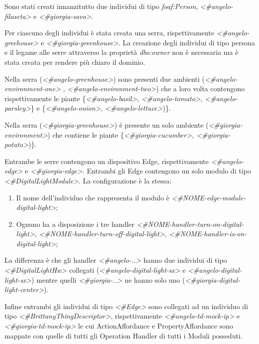 \noindent Sono stati creati innanzitutto due individui di tipo \textit{foaf:Person}, \textit{<\#angelo-filaseta>} e \textit{<\#giorgia-savo>}.\newline

\noindent Per ciascuno degli individui è stata creata una serra, rispettivamente \textit{<\#angelo-greehouse>} e \textit{<\#giorgia-greenhouse>}. La creazione degli individui di tipo persona e il legame alle serre attraverso la proprietà \textit{dbo:owner} non è necessaria ma è stata creata per rendere più chiaro il dominio.\newline

\noindent Nella serra (\textit{<\#angelo-greenhouse>}) sono presenti due ambienti (\textit{<\#angelo-environment-one>} , \textit{<\#angelo-environment-two>}) che a loro volta contengono rispettivamente le piante \{\textit{<\#angelo-basil>}, \textit{<\#angelo-tomato>}, \textit{<\#angelo-parsley>}\} e \{\textit{<\#angelo-onion>}, \textit{<\#angelo-lettuce>})\}.\newline

\noindent Nella serra (\textit{<\#giorgia-greenhouse>}) è presente un solo ambiente (\textit{<\#giorgia-environment>}) che contiene le piante \{\textit{<\#giorgia-cucumber>, <\#giorgia-potato>})\}. \newline

\noindent Entrambe le serre contengono un dispositivo Edge, rispettivamente \textit{<\#angelo-edge>} e \textit{<\#giorgia-edge>}. Entrambi gli Edge contengono un solo modulo di tipo \textit{<\#DigitalLightModule>}. La configurazione è la stessa:
\begin{enumerate}
	\item Il nome dell'individuo che rappresenta il modulo è \textit{<\#NOME-edge-module-digital-light>};
	\item Ognuno ha a disposizione i tre handler \textit{<\#NOME-handler-turn-on-digital-light>}, \textit{<\#NOME-handler-turn-off-digital-light>}, \textit{<\#NOME-handler-is-on-digital-light>};
\end{enumerate}
La differenza è che gli handler \textit{<\#angelo-..>} hanno due individui di tipo \textit{<\#DigitalLightHw>} collegati (\textit{<\#angelo-digital-light-sx>} e \textit{<\#angelo-digital-light-sx>}) mentre quelli \textit{<\#giorgia-..>} ne hanno solo uno (\textit{<\#giorgia-digital-light-center>}).\newline

\noindent Infine entrambi gli individui di tipo \textit{<\#Edge>} sono collegati ad un individuo di tipo \textit{<\#BrittanyThingDescriptor>}, rispettivamente \textit{<\#angelo-td-mock-ip>} e \textit{<\#giorgia-td-mock-ip>} le cui ActionAffordance e PropertyAffordance sono mappate con quelle di tutti gli Operation Handler di tutti i Moduli posseduti.

